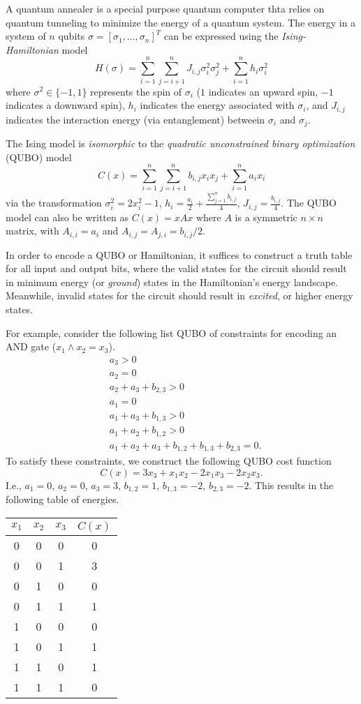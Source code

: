 \documentclass[12pt]{article}
\begin{document}
A quantum annealer is a special purpose quantum computer thta relies on
quantum tunneling to minimize the energy of a quantum system.
The energy in a system of $n$ qubits $\sigma=[\sigma_1,\ldots,\sigma_n]^T$
can be expressed using the {\it Ising-Hamiltonian} model
$$
H(\sigma) = \sum_{i=1}^n\sum_{j=i+1}^n J_{i,j}\sigma_i^2\sigma_j^2
+ \sum_{i=1}^n h_i \sigma_i^2
$$
where $\sigma^2 \in \{-1, 1\}$ represents the spin of $\sigma_i$
($1$ indicates an upward spin, $-1$ indicates a downward spin),
$h_i$ indicates the energy associated with $\sigma_i$, and
$J_{i,j}$ indicates the interaction energy (via entanglement)
betweein $\sigma_i$ and $\sigma_j$.

The Ising model is {\it isomorphic} to the
{\it quadratic unconstrained binary optimization} (QUBO) model
$$
C(x) = \sum_{i=1}^n\sum_{j=i+1}^n b_{i,j} x_i x_j +
\sum_{i=1}^n a_i x_i
$$
via the transformation $\sigma_i^2 = 2x_i^2 - 1$,
$h_i = \frac{a_i}{2} + \frac{\sum_{j=1}^n b_{i,j}}{4}$,
$J_{i,j} = \frac{b_{i,j}}{4}$.
The QUBO model can also be written as $C(x) = xAx$ where $A$ is a symmetric
$n \times n$ matrix, with $A_{i,i} = a_i$ and $A_{i,j} = A_{j,i} = b_{i,j}/2$.

In order to encode a QUBO or Hamiltonian, it suffices to construct a truth
table for all input and output bits, where the valid states for the circuit
should result in minimum energy (or {\it ground}) states in the
Hamiltonian's energy landscape.
Meanwhile, invalid states for the circuit should result in {\it excited},
or higher energy states.

For example, consider the following list QUBO of constraints
for encoding an AND gate ($x_1 \wedge x_2 = x_3$).
\begin{align*}
& a_3 > 0\\
& a_2 = 0\\
& a_2 + a_3 + b_{2,3} > 0\\
& a_1 = 0\\
& a_1 + a_3 + b_{1,3} > 0\\
& a_1 + a_2 + b_{1,2} > 0\\
& a_1 + a_2 + a_3 + b_{1,2} + b_{1,3} + b_{2,3} = 0.
\end{align*}
To satisfy these constraints, we construct the following QUBO cost
function
$$
C(x) = 3x_3 + x_1 x_2 - 2 x_1 x_3 - 2 x_2 x_3.
$$
I.e., $a_1 = 0$, $a_2 = 0$, $a_3 = 3$, $b_{1,2} = 1$, 
$b_{1,3} = -2$, $b_{2,3} = -2$.
This results in the following table of energies.
\begin{center}
\begin{tabular}{c|c|c|c}
	$x_1$ & $x_2$ & $x_3$ & $C(x)$ \\
	\hline 
	0 & 0 & 0 & 0\\
	\hline 
	0 & 0 & 1 & 3\\
	\hline 
	0 & 1 & 0 & 0\\
	\hline 
	0 & 1 & 1 & 1\\
	\hline 
	1 & 0 & 0 & 0\\
	\hline 
	1 & 0 & 1 & 1\\
	\hline 
	1 & 1 & 0 & 1\\
	\hline 
	1 & 1 & 1 & 0\\
\end{tabular}\end{center}
\end{document}
